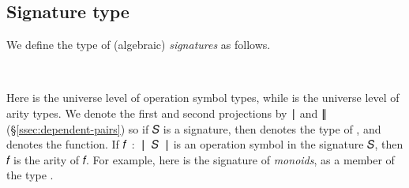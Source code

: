 \documentclass[a4paper,UKenglish,cleveref,autoref,thm-restate,11pt]{lipics-v2021}
\begin{document}
\subsection{Signature type}\label{signature-type}
We define the type of (algebraic) \emph{signatures} as follows.
\ccpad
\begin{code}%
\>[0]\AgdaSpace{}%
\AgdaSymbol{:}\AgdaSpace{}%
\AgdaSymbol{(}\AgdaSpace{}%
\AgdaSpace{}%
\AgdaSymbol{:}\AgdaSpace{}%
\AgdaSymbol{)}\AgdaSpace{}%
\AgdaSpace{}%
\AgdaSymbol{(}\AgdaSpace{}%
\AgdaSpace{}%
\AgdaSymbol{)}\AgdaSpace{}%
%
\<%
\\
\>[0]\AgdaSpace{}%
\AgdaSpace{}%
\AgdaSpace{}%
\AgdaSymbol{=}\AgdaSpace{}%
\AgdaSpace{}%
\AgdaSpace{}%
\AgdaSpace{}%
\AgdaSpace{}%
\AgdaSpace{}%
\AgdaFunction{,}\AgdaSpace{}%
\AgdaSymbol{(}\AgdaSpace{}%
\AgdaSpace{}%
\AgdaSpace{}%
\AgdaSymbol{)}\<%
\end{code}
\ccpad
Here  is the universe level of operation symbol types, while  is the universe level of arity types. We denote the first and second projections by \ai ∣ and \ai ∥ (\S\ref{ssec:dependent-pairs}) so if \ab 𝑆 is a signature, then  denotes the type of , and  denotes the  function. If \ab 𝑓~\as :~\af ∣~\ab 𝑆~\af ∣ is an operation symbol in the signature \ab 𝑆, then  \ab 𝑓 is the arity of \ab 𝑓. For example, %
here is the signature of \emph{monoids}, as a member of the type   .
\ccpad
\end{document}
